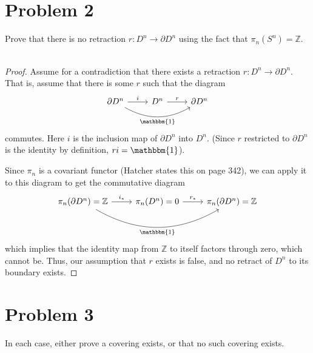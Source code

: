\documentclass[fontsize=11pt]{scrartcl} %
\numberwithin{equation}{section} %
\numberwithin{figure}{section} %
\numberwithin{table}{section} %
\newcommand{\Z}{\mathbb{Z}}
\begin{document}
\section*{Problem 2}
Prove that there is no retraction $r:D^n\to\partial D^n$ using the fact that
$\pi_n(S^n)=\Z$.
\\
\\
\begin{proof}
    Assume for a contradiction that there exists a retraction $r:D^n\to \partial
    D^n$. That is, assume that there is some $r$ such that the diagram
    \[
        \begin{tikzcd}
            \partial D^n \arrow[r, "i"] \arrow[rr, "\mathbbm{1}"', bend right] &
            D^n \arrow[r, "r"] & \partial D^n
        \end{tikzcd}
    \]
    commutes. Here $i$ is the inclusion map of $\partial D^n$ into $D^n$. (Since
    $r$ restricted to $\partial D^n$ is the identity by definition,
    $ri=\mathbbm{1}$).

    Since $\pi_n$ is a covariant functor (Hatcher states this on page 342), we
    can apply it to this diagram to get the commutative diagram
    \[
        \begin{tikzcd}
            \pi_n(\partial D^n)=\Z \arrow[r, "i_*"] \arrow[rr, "\mathbbm{1}"', bend
            right] & \pi_n(D^n)=0 \arrow[r, "r_*"] & \pi_n(\partial D^n)=\Z
        \end{tikzcd}
    \]
    which implies that the identity map from $\Z$ to itself factors through
    zero, which cannot be. Thus, our assumption that $r$ exists is false, and no
    retract of $D^n$ to its boundary exists.
\end{proof}

\newpage

\section*{Problem 3}
In each case, either prove a covering exists, or that no such covering exists.
\end{document}
